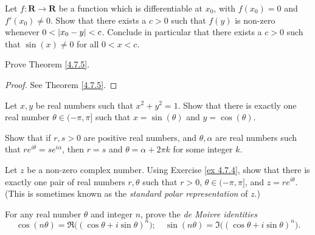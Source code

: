 \begin{exercise}\label{ex 4.7.2}
    Let \(f : \mathbf{R} \to \mathbf{R}\) be a function which is differentiable at \(x_0\), with \(f(x_0) = 0\) and \(f'(x_0) \neq 0\).
    Show that there exists a \(c > 0\) such that \(f(y)\) is non-zero whenever \(0 < \abs*{x_0 - y} < c\).
    Conclude in particular that there exists a \(c > 0\) such that \(\sin(x) \neq 0\) for all \(0 < x < c\).
\end{exercise}

\begin{exercise}\label{ex 4.7.3}
    Prove Theorem \ref{4.7.5}.
\end{exercise}

\begin{proof}
    See Theorem \ref{4.7.5}.
\end{proof}

\begin{exercise}\label{ex 4.7.4}
    Let \(x, y\) be real numbers such that \(x^2 + y^2 = 1\).
    Show that there is exactly one real number \(\theta \in (-\pi, \pi]\) such that \(x = \sin(\theta)\) and \(y = \cos(\theta)\).
\end{exercise}

\begin{exercise}\label{ex 4.7.5}
    Show that if \(r, s > 0\) are positive real numbers, and \(\theta, \alpha\) are real numbers such that \(r e^{i \theta} = s e^{i \alpha}\), then \(r = s\) and \(\theta = \alpha + 2 \pi k\) for some integer \(k\).
\end{exercise}

\begin{exercise}\label{ex 4.7.6}
    Let \(z\) be a non-zero complex number.
    Using Exercise \ref{ex 4.7.4}, show that there is exactly one pair of real numbers \(r, \theta\) such that \(r > 0\), \(\theta \in (-\pi, \pi]\), and \(z = r e^{i \theta}\).
    (This is sometimes known as the \emph{standard polar representation} of \(z\).)
\end{exercise}

\begin{exercise}\label{ex 4.7.7}
    For any real number \(\theta\) and integer \(n\), prove the \emph{de Moivre identities}
    \[
        \cos(n \theta) = \Re\big((\cos \theta + i \sin \theta)^n\big); \quad \sin(n \theta) = \Im\big((\cos \theta + i \sin \theta)^n\big).
    \]
\end{exercise}

